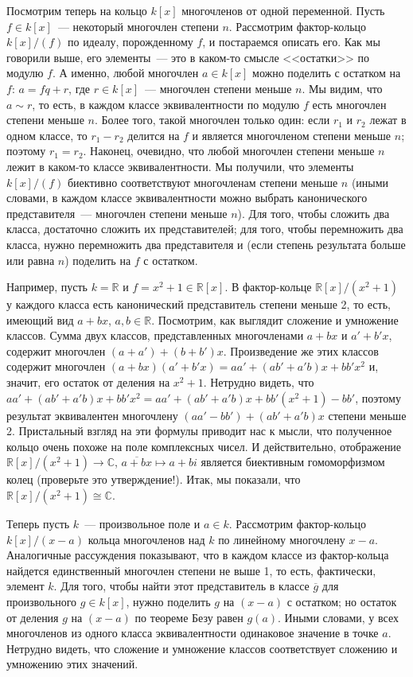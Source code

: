 \documentclass[a4paper,11pt]{scrartcl}
\theoremstyle{plain}
\theoremstyle{definition}
\newcommand\mb{\mathbb}
\newcommand\isom{\cong}
\begin{document}
Посмотрим теперь на кольцо $k[x]$ многочленов от одной
переменной. Пусть $f\in k[x]$~--- некоторый многочлен степени $n$.
Рассмотрим
фактор-кольцо $k[x]/(f)$ по идеалу, порожденному $f$, и постараемся
описать его. Как мы говорили выше, его элементы~--- это в каком-то
смысле <<остатки>> по модулю $f$. А именно, любой многочлен $a\in
k[x]$ можно поделить с остатком на $f$: $a=fq+r$, где $r\in k[x]$~---
многочлен степени меньше $n$. Мы видим, что $a\sim r$, то есть, в
каждом классе эквивалентности по модулю $f$ есть многочлен степени
меньше $n$. Более того, такой многочлен только один: если $r_1$ и
$r_2$ лежат в одном классе, то $r_1-r_2$ делится на $f$ и является
многочленом степени меньше $n$; поэтому $r_1=r_2$. Наконец, очевидно,
что любой многочлен степени меньше $n$ лежит в каком-то классе
эквивалентности. Мы получили, что элементы $k[x]/(f)$ биективно
соответствуют многочленам степени меньше $n$ (иными словами, в каждом
классе эквивалентности можно выбрать канонического представителя~---
многочлен степени меньше $n$). Для того, чтобы сложить два класса,
достаточно сложить их представителей; для того, чтобы перемножить два
класса, нужно перемножить два представителя и (если степень результата
больше или равна $n$) поделить на $f$ с остатком.

Например, пусть $k=\mb R$ и $f=x^2+1\in\mb R[x]$. В фактор-кольце
$\mb R[x]/(x^2+1)$ у каждого класса есть канонический представитель
степени меньше 2, то есть, имеющий вид $a+bx$, $a,b\in\mb
R$. Посмотрим, как выглядит сложение и умножение классов.
Сумма двух классов,
представленных многочленами $a+bx$ и $a'+b'x$, содержит многочлен
$(a+a')+(b+b')x$. Произведение же этих классов содержит многочлен
$(a+bx)(a'+b'x)=aa'+(ab'+a'b)x+bb'x^2$ и, значит, его остаток от
деления на $x^2+1$. Нетрудно видеть, что
$aa'+(ab'+a'b)x+bb'x^2=aa'+(ab'+a'b)x+bb'(x^2+1)-bb'$, поэтому
результат эквивалентен многочлену $(aa'-bb')+(ab'+a'b)x$ степени
меньше 2. Пристальный взгляд на эти формулы приводит нас к мысли, что
полученное кольцо очень похоже на поле комплексных чисел. И
действительно, отображение $\mb R[x]/(x^2+1)\to \mb C$,
$\overline{a+bx}\mapsto a+bi$ является биективным гомоморфизмом колец
(проверьте это утверждение!). Итак, мы показали, что $\mb
R[x]/(x^2+1)\isom\mb C$.

Теперь пусть $k$~--- произвольное поле и $a\in k$. Рассмотрим
фактор-кольцо
$k[x]/(x-a)$ кольца многочленов над $k$ по линейному многочлену $x-a$.
Аналогичные рассуждения показывают, что в каждом классе из
фактор-кольца найдется единственный многочлен степени не выше 1, то
есть, фактически, элемент $k$. Для того, чтобы найти этот
представитель в классе $\overline{g}$ для произвольного $g\in k[x]$,
нужно поделить $g$ на $(x-a)$ с остатком; но остаток от деления $g$ на
$(x-a)$ по теореме Безу равен $g(a)$. Иными словами, у всех
многочленов из одного класса эквивалентности одинаковое значение в
точке $a$. Нетрудно видеть, что сложение и умножение классов
соответствует сложению и умножению этих значений.
\end{document}
